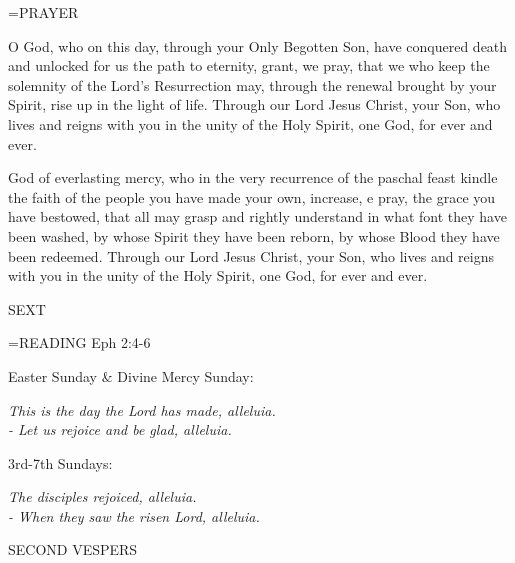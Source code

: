 \hangindent=\parindent \small PRAYER
\begin{description}[labelindent=\parindent, noitemsep, leftmargin=*]
\item [Easter Sunday:] 	O God, who on this day, through your Only Begotten Son, have conquered death and unlocked for us the path to eternity, grant, we pray, that we who keep the solemnity of the Lord's Resurrection may, through the renewal brought by your Spirit, rise up in the light of life. Through our Lord Jesus Christ, your Son, who lives and reigns with you in the unity of the Holy Spirit, one God, for ever and ever.
\item [Divine Mercy Sunday:] 	God of everlasting mercy, who in the very recurrence of the paschal feast kindle the faith of the people you have made your own, increase, e pray, the grace you have bestowed, that all may grasp and rightly understand in what font they have been washed, by whose Spirit they have been reborn, by whose Blood they have been redeemed. Through our Lord Jesus Christ, your Son, who lives and reigns with you in the unity of the Holy Spirit, one God, for ever and ever.
\item [3rd Sunday:] 		
\item [4th Sunday:] 		
\item [5th Sunday:] 		
\item [6th Sunday:] 		
\item [7th Sunday:] 	
\end{description}

\begin{flushleft}\normalsize SEXT\\\end{flushleft}

\hangindent=\parindent \small{READING}    Eph 2:4-6 \textbf{   }

\begin{center}
\end{center}Easter Sunday \& Divine Mercy Sunday:\begin{center}\textit{	This is the day the Lord has made, alleluia.\\
- Let us rejoice and be glad, alleluia.}
\end{center}3rd-7th Sundays:\begin{center}\textit{	The disciples rejoiced, alleluia.\\
- When they saw the risen Lord, alleluia.}
\end{center}

\begin{flushleft}\normalsize SECOND VESPERS\\\end{flushleft}


